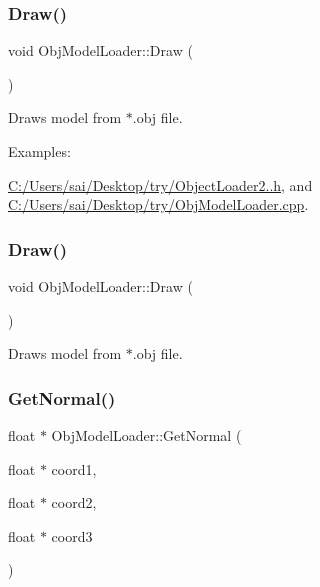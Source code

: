 \subsubsection{\texorpdfstring{Draw()}{Draw()}\hspace{0.1cm}{\footnotesize\ttfamily [2/3]}}
{\footnotesize\ttfamily void Obj\+Model\+Loader\+::\+Draw (\begin{DoxyParamCaption}{ }\end{DoxyParamCaption})}

Draws model from $\ast$.obj file. \begin{Desc}
\item[Examples\+: ]\par
\mbox{\hyperlink{_c_1_2_users_2sai_2_desktop_2try_2_object_loader2_88_8h-example}{C\+:/\+Users/sai/\+Desktop/try/\+Object\+Loader2..\+h}}, and \mbox{\hyperlink{_c_1_2_users_2sai_2_desktop_2try_2_obj_model_loader_8cpp-example}{C\+:/\+Users/sai/\+Desktop/try/\+Obj\+Model\+Loader.\+cpp}}.\end{Desc}
\mbox{\label{class_obj_model_loader_a65fe8c583425b7c77577ababd9073d37}} 
\subsubsection{\texorpdfstring{Draw()}{Draw()}\hspace{0.1cm}{\footnotesize\ttfamily [3/3]}}
{\footnotesize\ttfamily void Obj\+Model\+Loader\+::\+Draw (\begin{DoxyParamCaption}{ }\end{DoxyParamCaption})}

Draws model from $\ast$.obj file. \mbox{\label{class_obj_model_loader_a6b2aa4e718570359e6b654ad948c0aa3}} 
\subsubsection{\texorpdfstring{Get\+Normal()}{GetNormal()}\hspace{0.1cm}{\footnotesize\ttfamily [1/3]}}
{\footnotesize\ttfamily float $\ast$ Obj\+Model\+Loader\+::\+Get\+Normal (\begin{DoxyParamCaption}\item[{float $\ast$}]{coord1,  }\item[{float $\ast$}]{coord2,  }\item[{float $\ast$}]{coord3 }\end{DoxyParamCaption})\hspace{0.3cm}{\ttfamily [private]}}

